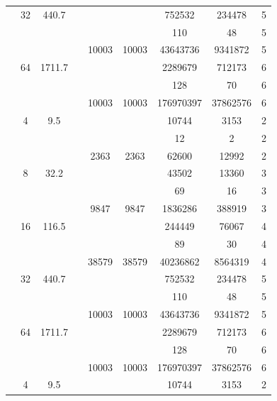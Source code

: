 \begin{table}[htbp]
\begin{tabular}{l S[table-format=3.0] S[table-format=4.1] l S[table-format=6.0] S[table-format=6.0] S[table-format=6.0] S[table-format=5.0] S[table-format=2.0]}
     & 32 & 440.7 &  & {\text{---}} & {\text{---}} & 752532 & 234478 & 5 \\
     &  &  &  & {\text{---}} & {\text{---}} & 110 & 48 & 5 \\
     &  &  &  & 10003 & 10003 & 43643736 & 9341872 & 5 \\
     & 64 & 1711.7 &  & {\text{---}} & {\text{---}} & 2289679 & 712173 & 6 \\
     &  &  &  & {\text{---}} & {\text{---}} & 128 & 70 & 6 \\
     &  &  &  & 10003 & 10003 & 176970397 & 37862576 & 6 \\
    \midrule
     & 4 & 9.5 &  & {\text{---}} & {\text{---}} & 10744 & 3153 & 2 \\
     &  &  &  & {\text{---}} & {\text{---}} & 12 & 2 & 2 \\
     &  &  &  & 2363 & 2363 & 62600 & 12992 & 2 \\
     & 8 & 32.2 &  & {\text{---}} & {\text{---}} & 43502 & 13360 & 3 \\
     &  &  &  & {\text{---}} & {\text{---}} & 69 & 16 & 3 \\
     &  &  &  & 9847 & 9847 & 1836286 & 388919 & 3 \\
     & 16 & 116.5 &  & {\text{---}} & {\text{---}} & 244449 & 76067 & 4 \\
     &  &  &  & {\text{---}} & {\text{---}} & 89 & 30 & 4 \\
     &  &  &  & 38579 & 38579 & 40236862 & 8564319 & 4 \\
     & 32 & 440.7 &  & {\text{---}} & {\text{---}} & 752532 & 234478 & 5 \\
     &  &  &  & {\text{---}} & {\text{---}} & 110 & 48 & 5 \\
     &  &  &  & 10003 & 10003 & 43643736 & 9341872 & 5 \\
     & 64 & 1711.7 &  & {\text{---}} & {\text{---}} & 2289679 & 712173 & 6 \\
     &  &  &  & {\text{---}} & {\text{---}} & 128 & 70 & 6 \\
     &  &  &  & 10003 & 10003 & 176970397 & 37862576 & 6 \\
    \midrule
     & 4 & 9.5 &  & {\text{---}} & {\text{---}} & 10744 & 3153 & 2 \\

\end{tabular}
\end{table}
